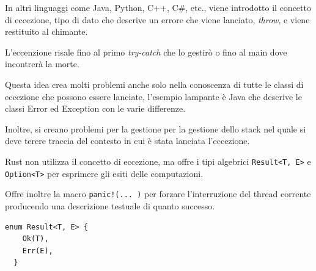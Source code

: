 In altri linguaggi come Java, Python, C++, C\#, etc.,  viene introdotto il concetto di
eccezione, tipo di dato che descrive un errore che viene lanciato, \textit{throw},
e viene restituito al chimante.

L'eccenzione risale fino al primo \textit{try-catch} che lo
gestirò o fino al main dove incontrerà la morte.\newline

Questa idea crea molti problemi anche solo nella conoscenza di tutte le classi
di eccezione che possono essere lanciate, l'esempio lampante è Java che
descrive le classi Error ed Exception con le varie differenze.




Inoltre, si creano problemi per la gestione per la gestione dello stack
nel quale si deve terere traccia del contesto in cui è stata lanciata l'eccezione.\newline


Rust non utilizza il concetto di eccezione, ma offre i tipi algebrici
\texttt{Result<T, E>} e \texttt{Option<T>} per esprimere
gli esiti delle computazioni.



Offre inoltre la macro \texttt{panic!(... )} per forzare l'interruzione del
thread corrente producendo una descrizione testuale di quanto successo.



\begin{verbatim}
enum Result<T, E> {
    Ok(T),
    Err(E),
  }
\end{verbatim}

